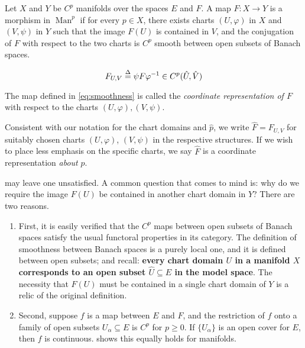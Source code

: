 \documentclass[../main-manifolds.tex]{subfiles}
\begin{document}
\begin{definition}\label{def:smoothness}
Let $X$ and $Y$ be $C^p$ manifolds over the spaces $E$ and $F$. A map $F: X\to Y$ is a morphism in $\operatorname{Man}^p$ if for every $p\in X$, there exists charts $(U,\varphi)$ in $X$ and $(V,\psi)$ in $Y$ such that the image $F(U)$ is contained in $V$, and the conjugation of $F$ with respect to the two charts is $C^p$ smooth between open subsets of Banach spaces.

\begin{equation}\label{eq:smoothness}
    F_{U,V}\overset{\Delta}{=} \psi F \varphi^{-1} \in C^p(\hat{U},\hat{V})    
\end{equation}

The map defined in \cref{eq:smoothness} is called the \emph{coordinate representation of $F$} with respect to the charts $(U,\varphi), (V,\psi)$.
\end{definition}

\begin{remark}
Consistent with our notation for the chart domains and $\hat{p}$, we write $\hat{F} = F_{U,V}$ for suitably chosen charts $(U,\varphi)$, $(V,\psi)$ in the respective structures. If we wish to place less emphasis on the specific charts, we say $\hat{F}$ is a coordinate representation \emph{about} $p$. 
\end{remark}

 may leave one unsatisfied. A common question that comes to mind is: why do we require the image $F(U)$ be contained in another chart domain in $Y$? There are two reasons.
\begin{enumerate}
    \item First, it is easily verified that the $C^p$ maps between open subsets of Banach spaces satisfy the usual functoral properties in its category. The definition of smoothness between Banach spaces is a purely local one, and it is defined between open subsets; and recall: \textbf{every chart domain $U$ in a manifold $X$ corresponds to an open subset $\hat{U}\subseteq E$ in the model space}. The necessity that $F(U)$ must be contained in a single chart domain of $Y$ is a relic of the original definition.
    \item Second, suppose $f$ is a map between $E$ and $F$, and the restriction of $f$ onto a family of open subsets $U_{\alpha}\subseteq E$ is $C^p$ for $p\geq 0$. If $\{U_\alpha\}$ is an open cover for $E$, then $f$ is continuous.  shows this equally holds for manifolds.
\end{enumerate}
\end{document}
